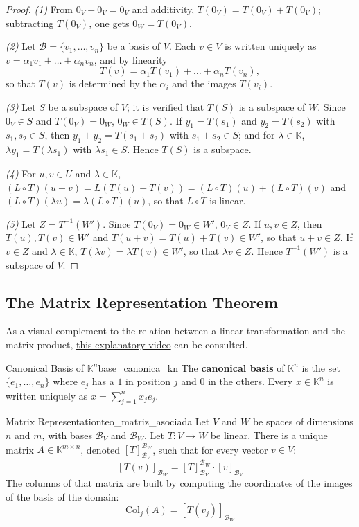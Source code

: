 \documentclass[11pt, a4paper]{article}
\begin{document}
\begin{proof}
\textit{(1)} From $0_V + 0_V = 0_V$ and additivity, $T(0_V) = T(0_V) + T(0_V)$; subtracting $T(0_V)$, one gets $0_W = T(0_V)$.

\textit{(2)} Let $\mathcal{B} = \{v_1, \dots, v_n\}$ be a basis of $V$. Each $v \in V$ is written uniquely as $v = \alpha_1 v_1 + \dots + \alpha_n v_n$, and by linearity
\[
T(v) = \alpha_1 T(v_1) + \dots + \alpha_n T(v_n),
\]
so that $T(v)$ is determined by the $\alpha_i$ and the images $T(v_i)$.

\textit{(3)} Let $S$ be a subspace of $V$; it is verified that $T(S)$ is a subspace of $W$. Since $0_V \in S$ and $T(0_V) = 0_W$, $0_W \in T(S)$. If $y_1 = T(s_1)$ and $y_2 = T(s_2)$ with $s_1, s_2 \in S$, then $y_1 + y_2 = T(s_1 + s_2)$ with $s_1 + s_2 \in S$; and for $\lambda \in \mathbb{K}$, $\lambda y_1 = T(\lambda s_1)$ with $\lambda s_1 \in S$. Hence $T(S)$ is a subspace.

\textit{(4)} For $u, v \in U$ and $\lambda \in \mathbb{K}$, $(L \circ T)(u + v) = L(T(u) + T(v)) = (L \circ T)(u) + (L \circ T)(v)$ and $(L \circ T)(\lambda u) = \lambda (L \circ T)(u)$, so that $L \circ T$ is linear.

\textit{(5)} Let $Z = T^{-1}(W')$. Since $T(0_V) = 0_W \in W'$, $0_V \in Z$. If $u, v \in Z$, then $T(u), T(v) \in W'$ and $T(u+v) = T(u) + T(v) \in W'$, so that $u + v \in Z$. If $v \in Z$ and $\lambda \in \mathbb{K}$, $T(\lambda v) = \lambda T(v) \in W'$, so that $\lambda v \in Z$. Hence $T^{-1}(W')$ is a subspace of $V$.
\end{proof}

\subsection{The Matrix Representation Theorem}

As a visual complement to the relation between a linear transformation and the matrix product, \href{https://youtu.be/3gxjK9zkKqc?si=_vvIvbiUcNyruPvx}{this explanatory video} can be consulted.

\begin{definicion}{Canonical Basis of $\mathbb{K}^n$}{base_canonica_kn}
The \textbf{canonical basis} of $\mathbb{K}^n$ is the set $\{e_1, \dots, e_n\}$ where $e_j$ has a $1$ in position $j$ and $0$ in the others. Every $x \in \mathbb{K}^n$ is written uniquely as $x = \sum_{j=1}^n x_j e_j$.
\end{definicion}

\begin{teorema}{Matrix Representation}{teo_matriz_asociada}
Let $V$ and $W$ be spaces of dimensions $n$ and $m$, with bases $\mathcal{B}_V$ and $\mathcal{B}_W$. Let $T: V \to W$ be linear.
There is a unique matrix $A \in \mathbb{K}^{m \times n}$, denoted $[T]_{\mathcal{B}_V}^{\mathcal{B}_W}$, such that for every vector $v \in V$:
\[
[T(v)]_{\mathcal{B}_W} = [T]_{\mathcal{B}_V}^{\mathcal{B}_W} \cdot [v]_{\mathcal{B}_V}
\]
The columns of that matrix are built by computing the coordinates of the images of the basis of the domain:
\[ \text{Col}_j(A) = [T(v_j)]_{\mathcal{B}_W} \]
\end{teorema}
\end{document}

